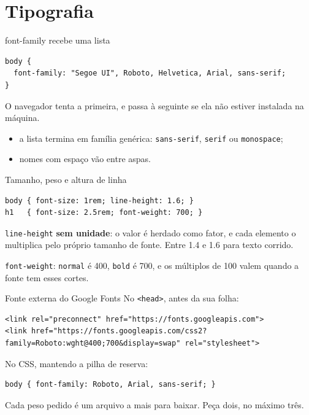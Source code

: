 \documentclass{beamer}
\begin{document}
\section{Tipografia}

\begin{frame}[fragile]{font-family recebe uma lista}
	\begin{verbatim}
body {
  font-family: "Segoe UI", Roboto, Helvetica, Arial, sans-serif;
}
  \end{verbatim}

	\vspace{0.3cm}
	O navegador tenta a primeira, e passa à seguinte se ela não estiver instalada
	na máquina.

	\begin{itemize}
		\item a lista termina em família genérica: \texttt{sans-serif},
		      \texttt{serif} ou \texttt{monospace};
		\item nomes com espaço vão entre aspas.
	\end{itemize}
\end{frame}

\begin{frame}[fragile]{Tamanho, peso e altura de linha}
	\begin{verbatim}
body { font-size: 1rem; line-height: 1.6; }
h1   { font-size: 2.5rem; font-weight: 700; }
  \end{verbatim}

	\vspace{0.3cm}
	\texttt{line-height} \textbf{sem unidade}: o valor é herdado como fator, e cada
	elemento o multiplica pelo próprio tamanho de fonte. Entre 1.4 e 1.6 para texto
	corrido.

	\vspace{0.3cm}
	\texttt{font-weight}: \texttt{normal} é 400, \texttt{bold} é 700, e os
	múltiplos de 100 valem quando a fonte tem esses cortes.
\end{frame}

\begin{frame}[fragile]{Fonte externa do Google Fonts}
	No \texttt{<head>}, antes da sua folha:

	\begin{verbatim}
<link rel="preconnect" href="https://fonts.googleapis.com">
<link href="https://fonts.googleapis.com/css2?family=Roboto:wght@400;700&display=swap" rel="stylesheet">
  \end{verbatim}

	No CSS, mantendo a pilha de reserva:

	\begin{verbatim}
body { font-family: Roboto, Arial, sans-serif; }
  \end{verbatim}

	\vspace{0.2cm}
	Cada peso pedido é um arquivo a mais para baixar. Peça dois, no máximo três.
\end{frame}
\end{document}
